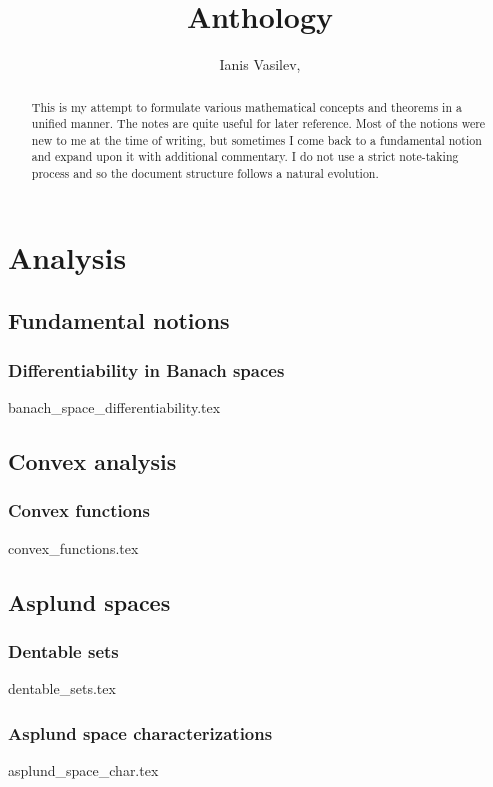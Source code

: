 \documentclass[numbers=endperiod, bibliography=totocnumbered]{scrartcl}
\title{Anthology}
\author{Ianis Vasilev, \Email{ianis@ivasilev.net}}
\date{}
\begin{document}
\maketitle

\begin{abstract}
  This is my attempt to formulate various mathematical concepts and theorems in a unified manner. The notes are quite useful for later reference. Most of the notions were new to me at the time of writing, but sometimes I come back to a fundamental notion and expand upon it with additional commentary. I do not use a strict note-taking process and so the document structure follows a natural evolution.
\end{abstract}

\tableofcontents

\section{Analysis}\label{sec:analysis}
\subsection{Fundamental notions}\label{sec:analysis/fundamental_notions}
\subsubsection{Differentiability in Banach spaces}\label{sec:banach_space_differentiability}
{banach_space_differentiability.tex}

\subsection{Convex analysis}\label{sec:convex_analysis}
\subsubsection{Convex functions}\label{sec:convex_functions}
{convex_functions.tex}

\subsection{Asplund spaces}\label{sec:asplund_spaces}
\subsubsection{Dentable sets}\label{sec:dentable_sets}
{dentable_sets.tex}
\subsubsection{Asplund space characterizations}\label{sec:asplund_space_char}
{asplund_space_char.tex}
\end{document}
